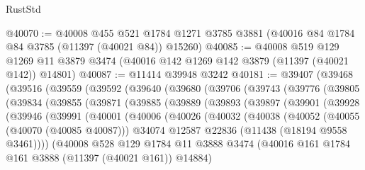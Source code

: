 \begin{lexlean}{RustStd}
\begin{coremodule}
@40070 := @40008
    @455
    @521
    @1784
    @1271
    @3785
    @3881
    (@40016 @84 @1784 @84 @3785 (@11397 (@40021 @84)) @15260)
@40085 := @40008
    @519
    @129
    @1269
    @11
    @3879
    @3474
    (@40016 @142 @1269 @142 @3879 (@11397 (@40021 @142)) @14801)
@40087 := @11414 @39948 @3242
@40181 := @39407
    (@39468
      (@39516
        (@39559
          (@39592
            (@39640
              (@39680
                (@39706
                  (@39743
                    (@39776
                      (@39805
                        (@39834
                          (@39855
                            (@39871
                              (@39885
                                (@39889
                                  (@39893
                                    (@39897
                                      (@39901
                                        (@39928
                                          (@39946
                                            (@39991
                                              (@40001
                                                (@40006
                                                  (@40026
                                                    (@40032
                                                      (@40038
                                                        (@40052
                                                          (@40055 (@40070 (@40085 @40087)))
                                                          @34074
                                                          @12587
                                                          @22836
                                                          (@11438 (@18194 @9558 @3461))))
                                                      (@40008
                                                        @528
                                                        @129
                                                        @1784
                                                        @11
                                                        @3888
                                                        @3474
                                                        (@40016
                                                          @161
                                                          @1784
                                                          @161
                                                          @3888
                                                          (@11397 (@40021 @161))
                                                          @14884)

\end{coremodule}
\end{lexlean}
